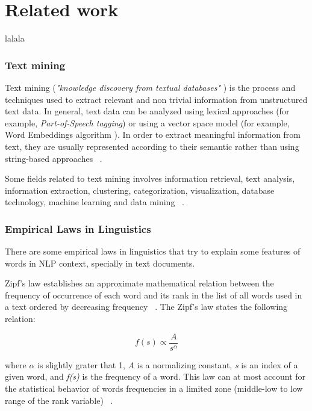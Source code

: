 
\chapter{Related work}
\label{ch:related_work}

lalala

%
\subsection{Text mining}
%
Text mining (\textit{"knowledge discovery from textual databases"} \cite{tan1999text}) is the process and techniques used to extract relevant and non trivial information from unstructured text data.  In general, text data can be analyzed using lexical approaches (for example, \textit{Part-of-Speech tagging}) or using a vector space model (for example, Word Embeddings algorithm \cite{compositionality2013Mikolov}). In order to extract meaningful information from text, they are usually represented according to their semantic rather than using string-based approaches ~\cite{aggarwal2012mining}.

Some fields related to text mining  involves information retrieval, text analysis, information extraction, clustering, categorization, visualization, database technology, machine learning and data mining ~\cite{tan1999text}.

%
\subsection{Empirical Laws in Linguistics}
%
There are some empirical laws in linguistics that try to explain some features of words in NLP context, specially in text documents.

Zipf's  law establishes an approximate mathematical relation between the frequency of occurrence of each word and its rank in the list of all words used in a text ordered by decreasing frequency ~\cite{montemurro2001beyond}.  The Zipf's law states the following relation:

\begin{center}
\begin{equation}
\label{ZipfLaw}
f(s)  \propto  \frac{A}{s^{\alpha}} 
\end{equation}
\end{center}


where \textit{{$\alpha$}} is slightly grater that 1, \textit{A} is a normalizing constant,  \textit{s} is an index of a given word, and \textit{f(s)} is the frequency of a word. This law can at most account for the statistical behavior of words frequencies in a limited zone (middle-low to low range of the rank variable) ~\cite{montemurro2001beyond}. \\

